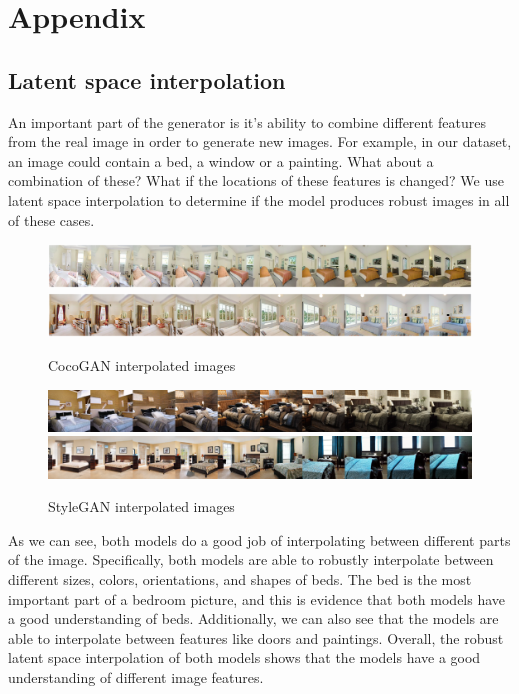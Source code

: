 \documentclass{article}
\begin{document}
    \section{Appendix}
    \subsection{Latent space interpolation}
        An important part of the generator is it's ability to combine different features from the real image in order to generate new images.
        For example, in our dataset, an image could contain a bed, a window or a painting. What about a combination of these?
        What if the locations of these features is changed? We use latent space interpolation to determine if the model produces robust images in all of these cases.
    \begin{figure}[H]
          \centering
          \includegraphics[scale=0.145]{latent-space/coco_latent_ex.png}
          \includegraphics[scale=0.145]{latent-space/cocogan_latent_interesting.png}
          \caption{CocoGAN interpolated images}
    \end{figure}
     \begin{figure}[H]
          \centering
          \includegraphics[scale=0.4]{latent-space/stylegan_latent_1.png}
          \includegraphics[scale=0.4]{latent-space/stylegan_latent_2.png}
          \caption{StyleGAN interpolated images}
    \end{figure}
        As we can see, both models do a good job of interpolating between different parts of the image. Specifically, both models are able to robustly interpolate between different sizes, colors, orientations, and shapes of beds. The bed is the most important part of a bedroom picture, and this is evidence that both models have a good understanding of beds. Additionally, we can also see that the models are able to interpolate between features like doors and paintings. Overall, the robust latent space interpolation of both models shows that the models have a good understanding of different image features. 
    \newpage
\end{document}
